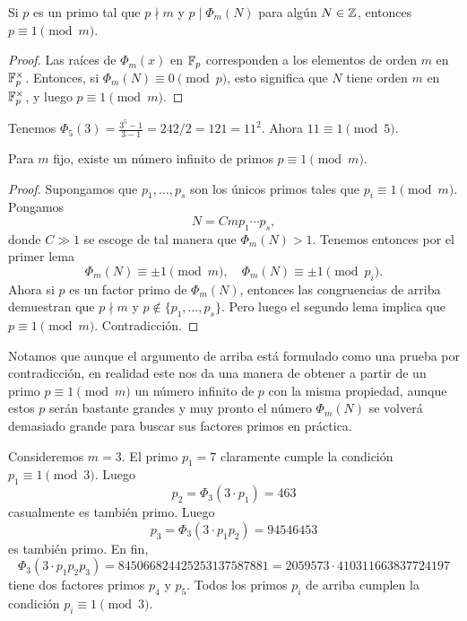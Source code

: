 \begin{lema}
  Si $p$ es un primo tal que $p \nmid m$ y $p \mid \Phi_m (N)$ para algún
  $N \in \mathbb{Z}$, entonces $p \equiv 1 \pmod{m}$.

  \begin{proof}
    Las raíces de $\Phi_m (x)$ en $\mathbb{F}_p$ corresponden a los elementos de orden
    $m$ en $\mathbb{F}_p^\times$. Entonces, si $\Phi_m (N) \equiv 0 \pmod{p}$, esto
    significa que $N$ tiene orden $m$ en $\mathbb{F}_p^\times$, y luego
    $p\equiv 1\pmod{m}$.
  \end{proof}
\end{lema}

\begin{ejemplo}
  Tenemos $\Phi_5 (3) = \frac{3^5 - 1}{3 - 1} = 242/2 = 121 = 11^2$.
  Ahora $11 \equiv 1 \pmod{5}$.
\end{ejemplo}

\begin{teorema}
  Para $m$ fijo, existe un número infinito de primos $p \equiv 1 \pmod{m}$.

  \begin{proof}
    Supongamos que $p_1,\ldots,p_s$ son los únicos primos tales que
    $p_i\equiv 1 \pmod{m}$. Pongamos
    $$N = C m p_1\cdots p_s,$$
    donde $C \gg 1$ se escoge de tal manera que $\Phi_m (N) > 1$.
    Tenemos entonces por el primer lema
    $$\Phi_m (N) \equiv \pm 1 \pmod{m}, \quad \Phi_m (N) \equiv \pm 1 \pmod{p_i}.$$
    Ahora si $p$ es un factor primo de $\Phi_m (N)$, entonces las congruencias
    de arriba demuestran que $p \nmid m$ y $p \notin \{ p_1, \ldots, p_s \}$.
    Pero luego el segundo lema implica que $p \equiv 1 \pmod{m}$. Contradicción.
  \end{proof}
\end{teorema}

Notamos que aunque el argumento de arriba está formulado como una prueba por
contradicción, en realidad este nos da una manera de obtener a partir de un
primo $p \equiv 1 \pmod{m}$ un número infinito de $p$ con la misma propiedad,
aunque estos $p$ serán bastante grandes y muy pronto el número $\Phi_m (N)$
se volverá demasiado grande para buscar sus factores primos en práctica.

\begin{ejemplo}
  Consideremos $m = 3$. El primo $p_1 = 7$ claramente cumple la condición
  $p_1 \equiv 1 \pmod{3}$. Luego
  $$p_2 = \Phi_3 (3\cdot p_1) = 463$$
  casualmente es también primo. Luego
  $$p_3 = \Phi_3 (3\cdot p_1 p_2) = 94546453$$
  es también primo. En fin,
  $$\Phi_3 (3\cdot p_1 p_2 p_3) = 845066824425253137587881 = 2059573\cdot 410311663837724197$$
  tiene dos factores primos $p_4$ y $p_5$. Todos los primos $p_i$ de arriba
  cumplen la condición $p_i \equiv 1 \pmod{3}$.
\end{ejemplo}

